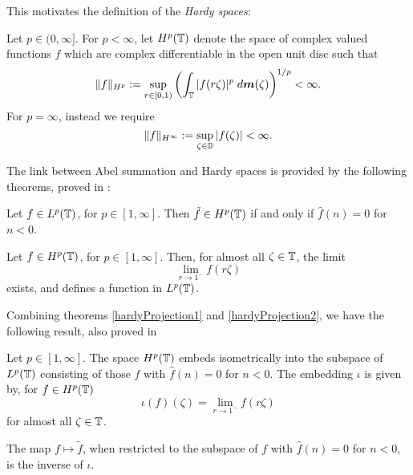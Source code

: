 This motivates the definition of the \emph{Hardy spaces}:
\begin{definition}
    Let $p \in (0,\infty]$. For $p < \infty$, let $H^p(\mathbb{T})$ denote the space
    of complex valued functions $f$ which are complex differentiable in the open unit disc
    such that
    \begin{equation}
        \|f\|_{H^p} := \sup_{r \in [0,1)} \left(\int_{\mathbb{T}} |f(r\zeta)|^p \;d\boldsymbol{m}(\zeta)\right)^{1/p} < \infty.
    \end{equation}
    For $p = \infty$, instead we require
    \begin{equation*}
        \|f\|_{H^\infty} := \sup_{\zeta \in \mathbb{D}} |f(\zeta)| < \infty.
    \end{equation*}
\end{definition}

The link between Abel summation and Hardy spaces is provided by the following theorems,
proved in \cite{katznelson}:
\begin{theorem}
\label{hardyProjection1}
    Let $f \in L^p(\mathbb{T})$, for $p \in [1,\infty]$. Then $\tilde{f} \in H^p(\mathbb{T})$
    if and only if $\hat{f}(n) = 0$ for $n < 0$.
\end{theorem}
\begin{theorem}
\label{hardyProjection2}
    Let $f \in H^p(\mathbb{T})$, for $p \in [1,\infty]$. Then, for almost all $\zeta \in \mathbb{T}$,
    the limit
    \begin{equation*}
        \lim_{r\to 1^-} f(r\zeta)
    \end{equation*}
    exists, and defines a function in $L^p(\mathbb{T})$.
\end{theorem}

Combining theorems \ref{hardyProjection1} and \ref{hardyProjection2}, we 
have the following result, also proved in \cite{katznelson}
\begin{theorem}
    Let $p \in [1,\infty]$. The space $H^p(\mathbb{T})$ embeds
    isometrically into the subspace of $L^p(\mathbb{T})$
    consisting of those $f$ with $\hat{f}(n) = 0$ for $n < 0$. The embedding $\iota$
    is given by, for $f \in H^p(\mathbb{T})$
    \begin{equation}
        \iota(f)(\zeta) = \lim_{r\to 1^-} f(r\zeta)
    \end{equation}
    for almost all $\zeta \in \mathbb{T}$.
    
    The map $f\mapsto \tilde{f}$, when restricted to the subspace
    of $f$ with $\hat{f}(n) = 0$ for $n < 0$, is the inverse of $\iota$.
\end{theorem}

